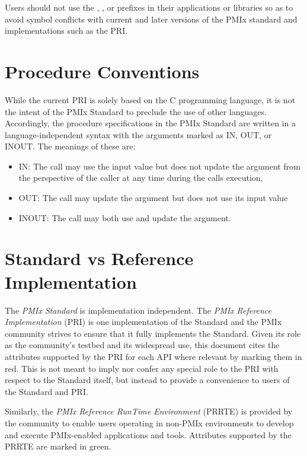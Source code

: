 Users should not use the \textbf{}, \textbf{}, or \textbf{} prefixes in their applications or libraries so as to avoid symbol conflicts with current and later versions of the \ac{PMIx} standard and implementations such as the \ac{PRI}.

\section{Procedure Conventions}

While the current \acf{PRI} is solely based on the C programming language, it is not the intent of the \ac{PMIx} Standard to preclude the use of other languages.
Accordingly, the procedure specifications in the \ac{PMIx} Standard are written in a language-independent syntax with the arguments marked as IN, OUT, or INOUT.
The meanings of these are:
\begin{itemize}
\item IN:
The call may use the input value but does not update the argument from the perspective of the caller at any time during the calls execution,
\item OUT:
The call may update the argument but does not use its input value
\item INOUT:
The call may both use and update the argument.
\end{itemize}

\section{Standard vs Reference Implementation}

The \textit{PMIx Standard} is implementation independent. The \textit{PMIx Reference Implementation} (PRI) is one implementation of the Standard and the \ac{PMIx} community strives to ensure that it fully implements the Standard. Given its role as the community's testbed and its widespread use, this document cites the attributes supported by the \ac{PRI} for each \ac{API} where relevant by marking them in {\color{red}red}. This is not meant to imply nor confer any special role to the \ac{PRI} with respect to the Standard itself, but instead to provide a convenience to users of the Standard and \ac{PRI}.

Similarly, the \textit{PMIx Reference RunTime Environment} (PRRTE) is provided by the community to enable users operating in non-\ac{PMIx} environments to develop and execute \ac{PMIx}-enabled applications and tools. Attributes supported by the \ac{PRRTE} are marked in {\color{green!60!black}green}.

